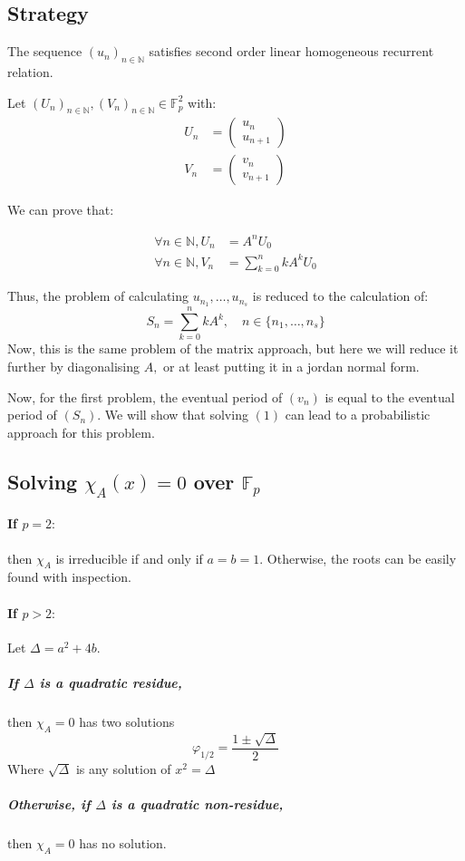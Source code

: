 \documentclass[]{article}
\begin{document}
\subsection{Strategy}
The sequence $(u_n)_{n\in\mathbb{N}}$ satisfies second order linear homogeneous recurrent relation.

Let $(U_n)_{n\in\mathbb{N}},(V_n)_{n\in\mathbb{N}}\in\mathbb{F}_p^2$ with:
\begin{align*}
	U_n&= \begin{pmatrix}
		u_n\\ u_{n+1}
	\end{pmatrix}\\
	V_n&= \begin{pmatrix}
		v_n\\ v_{n+1}
	\end{pmatrix}
\end{align*}

We can prove that:

\begin{align*}
	\forall n\in\mathbb{N}, U_n&=A^nU_0\\
	\forall n\in\mathbb{N}, V_n&=\sum_{k=0}^nkA^kU_0
\end{align*}

Thus, the problem of calculating $u_{n_1},\dots,u_{n_s}$ is reduced to the calculation of:
\begin{equation}\tag{1}
	\boxed{S_n=\sum_{k=0}^n kA^k,\quad n\in\{n_1,\dots,n_s\}} 
\end{equation}
Now, this is the same problem of the matrix approach, but here we will reduce it further by diagonalising $A,$ or at least putting it in a jordan normal form.


Now, for the first problem, the eventual period of $(v_n)$ is equal to the eventual period of $(S_n).$ We will show that solving $(1)$ can lead to a probabilistic approach for this problem.
\subsection{Solving $\chi_A(x) = 0$ over $\mathbb{F}_p$}
\paragraph{If $p=2: $} then $\chi_A$ is irreducible if and only if $a=b=1.$ Otherwise, the roots can be easily found with inspection.
\paragraph{If $p>2: $} Let $\Delta=a^2+4b$.
\subparagraph{If $\Delta$ is a quadratic residue,} then $\chi_A=0$ has two solutions $$\varphi_{1/2}=\frac{1\pm \sqrt{\Delta}}{2}$$Where $\sqrt{\Delta}$ is any solution of $x^2=\Delta$
\subparagraph{Otherwise, if $\Delta$ is a quadratic non-residue,} then $\chi_A = 0$ has no solution.
\end{document}
